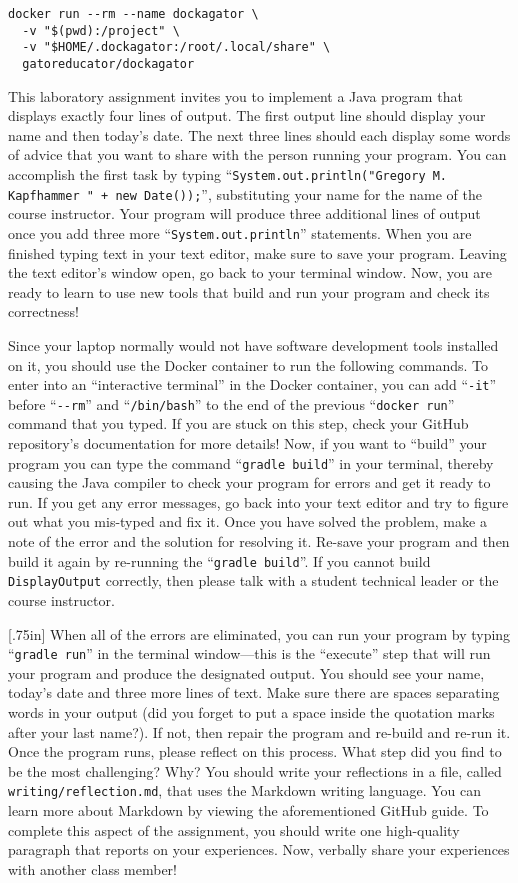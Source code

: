 \documentclass[11pt]{article}
\newcommand{\mainprogram}{\lstinline{DisplayOutput}}
\newcommand{\reflection}{\lstinline{writing/reflection.md}}
\newcommand{\gradlebuild}{\command{gradle build}}
\newcommand{\gradlerun}{\command{gradle run}}
\newcommand{\command}[1]{``\lstinline{#1}''}
\newcommand{\step}[1]{``{#1}''}
\newcommand{\think}[1]{\null\hfill\LARGE{\faCogs{}}\newline\scriptsize{\em{#1}}}
\begin{document}
\begin{verbatim}
docker run --rm --name dockagator \
  -v "$(pwd):/project" \
  -v "$HOME/.dockagator:/root/.local/share" \
  gatoreducator/dockagator
\end{verbatim}

This laboratory assignment invites you to implement a Java program that displays
exactly four lines of output. The first output line should display your name and
then today's date. The next three lines should each display some words of advice
that you want to share with the person running your program. You can accomplish
the first task by typing \command{System.out.println("Gregory M. Kapfhammer " +
new Date());}, substituting your name for the name of the course instructor.
Your program will produce three additional lines of output once you add three
more \command{System.out.println} statements. When you are finished typing text
in your text editor, make sure to save your program. Leaving the text editor's
window open, go back to your terminal window. Now, you are ready to learn to use
new tools that build and run your program and check its correctness!

Since your laptop normally would not have software development tools installed
on it, you should use the Docker container to run the following commands. To
enter into an ``interactive terminal'' in the Docker container, you can add
\command{-it} before \command{--rm} and \command{/bin/bash} to the end of the
previous \command{docker run} command that you typed. If you are stuck on this
step, check your GitHub repository's documentation for more details! Now, if
you want to \step{build} your program you can type the command \gradlebuild{}
in your terminal, thereby causing the Java compiler to check your program for
errors and get it ready to run. If you get any error messages, go back into
your text editor and try to figure out what you mis-typed and fix it. Once you
have solved the problem, make a note of the error and the solution for
resolving it. Re-save your program and then build it again by re-running the
\gradlebuild{}. If you cannot build \mainprogram{} correctly, then please talk
with a student technical leader or the course instructor.

\marginnote{\think{Reflect on challenges}}[.75in] When all of the errors are
eliminated, you can run your program by typing \gradlerun{} in the terminal
window---this is the ``execute'' step that will run your program and produce
the designated output. You should see your name, today's date and three more
lines of text. Make sure there are spaces separating words in your output (did
you forget to put a space inside the quotation marks after your last name?). If
not, then repair the program and re-build and re-run it. Once the program runs,
please reflect on this process. What step did you find to be the most
challenging? Why? You should write your reflections in a file, called
\reflection{}, that uses the Markdown writing language. You can learn more
about Markdown by viewing the aforementioned GitHub guide. To complete this
aspect of the assignment, you should write one high-quality paragraph that
reports on your experiences. Now, verbally share your experiences with another
class member!
\end{document}

